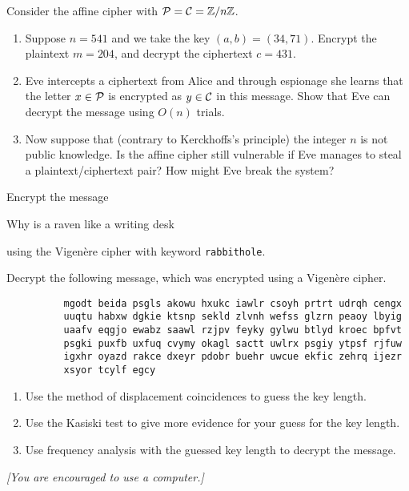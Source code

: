 \documentclass[11pt]{amsart}
\newcounter{problem}
\begin{document}
\thispagestyle{empty}

\title{} 

\date{\today}


\bigskip



\begin{problem}
Consider the affine cipher with $\mathcal{P}=\mathcal{C}=\mathbb{Z}/n\mathbb{Z}$.  
\begin{enumerate}\renewcommand{\itemsep}{3mm}
\item Suppose $n=541$ and we take the key $(a,b)=(34,71)$.  Encrypt the plaintext $m=204$, and decrypt the ciphertext $c=431$.
\item Eve intercepts a ciphertext from Alice and through espionage she learns that the letter $x \in \mathcal{P}$ is encrypted as $y \in \mathcal{C}$ in this message.  Show that Eve can decrypt the message using $O(n)$ trials.  
\item Now suppose that (contrary to Kerckhoffs's principle) the integer $n$ is not public knowledge.  Is the affine cipher still vulnerable if Eve manages to steal a plaintext/ciphertext pair?  How might Eve break the system?
\end{enumerate}
\end{problem}

\begin{problem}
Encrypt the message 
\begin{center}
\textsf{Why is a raven like a writing desk} 
\end{center}
using the Vigen\`ere cipher with keyword \texttt{rabbithole}.
\end{problem}

\begin{problem}
Decrypt the following message, which was encrypted using a Vigen\`ere cipher.
\begin{verbatim}
          mgodt beida psgls akowu hxukc iawlr csoyh prtrt udrqh cengx
          uuqtu habxw dgkie ktsnp sekld zlvnh wefss glzrn peaoy lbyig
          uaafv eqgjo ewabz saawl rzjpv feyky gylwu btlyd kroec bpfvt
          psgki puxfb uxfuq cvymy okagl sactt uwlrx psgiy ytpsf rjfuw
          igxhr oyazd rakce dxeyr pdobr buehr uwcue ekfic zehrq ijezr
          xsyor tcylf egcy
\end{verbatim}
\begin{enumerate}\renewcommand{\itemsep}{3mm}
\item Use the method of displacement coincidences to guess the key length.
\item Use the Kasiski test to give more evidence for your guess for the key length.  
\item Use frequency analysis with the guessed key length to decrypt the message.
\end{enumerate}
\emph{[You are encouraged to use a computer.]}
\end{problem}
\end{document}
